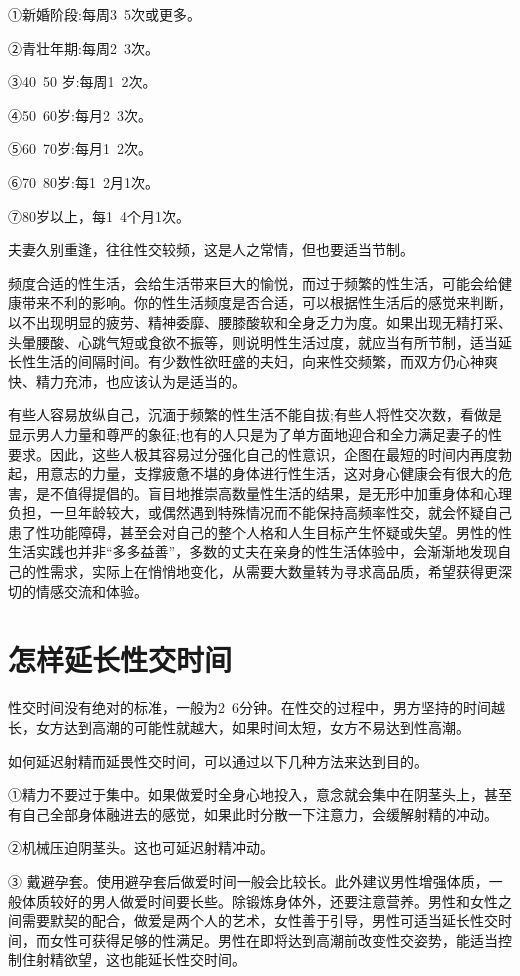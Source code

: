 \documentclass[12pt,UTF8]{ctexbook}
\begin{document}
①新婚阶段:每周3~5次或更多。

②青壮年期:每周2~3次。

③40~50 岁:每周1~2次。

④50~60岁:每月2~3次。

⑤60~70岁:每月1~2次。

⑥70~80岁:每1~2月1次。

⑦80岁以上，每1~4个月1次。

夫妻久别重逢，往往性交较频，这是人之常情，但也要适当节制。

频度合适的性生活，会给生活带来巨大的愉悦，而过于频繁的性生活，可能会给健康带来不利的影响。你的性生活频度是否合适，可以根据性生活后的感觉来判断，以不出现明显的疲劳、精神委靡、腰膝酸软和全身乏力为度。如果出现无精打采、头暈腰酸、心跳气短或食欲不振等，则说明性生活过度，就应当有所节制，适当延长性生活的间隔时间。有少数性欲旺盛的夫妇，向来性交频繁，而双方仍心神爽快、精力充沛，也应该认为是适当的。

有些人容易放纵自己，沉湎于频繁的性生活不能自拔;有些人将性交次数，看做是显示男人力量和尊严的象征;也有的人只是为了单方面地迎合和全力满足妻子的性要求。因此，这些人极其容易过分强化自己的性意识，企图在最短的时间内再度勃起，用意志的力量，支撑疲惫不堪的身体进行性生活，这对身心健康会有很大的危害，是不值得提倡的。盲目地推崇高数量性生活的结果，是无形中加重身体和心理负担，一旦年龄较大，或偶然遇到特殊情况而不能保持高频率性交，就会怀疑自己患了性功能障碍，甚至会对自己的整个人格和人生目标产生怀疑或失望。男性的性生活实践也并非“多多益善”，多数的丈夫在亲身的性生活体验中，会渐渐地发现自己的性需求，实际上在悄悄地变化，从需要大数量转为寻求高品质，希望获得更深切的情感交流和体验。

\section{怎样延长性交时间}

性交时间没有绝对的标准，一般为2~6分钟。在性交的过程中，男方坚持的时间越长，女方达到高潮的可能性就越大，如果时间太短，女方不易达到性高潮。

如何延迟射精而延畏性交时间，可以通过以下几种方法来达到目的。

①精力不要过于集中。如果做爱时全身心地投入，意念就会集中在阴茎头上，甚至有自己全部身体融进去的感觉，如果此时分散一下注意力，会缓解射精的冲动。

②机械压迫阴茎头。这也可延迟射精冲动。

③ 戴避孕套。使用避孕套后做爱时间一般会比较长。此外建议男性增强体质，一般体质较好的男人做爱时间要长些。除锻炼身体外，还要注意营养。男性和女性之间需要默契的配合，做爱是两个人的艺术，女性善于引导，男性可适当延长性交时间，而女性可获得足够的性满足。男性在即将达到高潮前改变性交姿势，能适当控制住射精欲望，这也能延长性交时间。
\end{document}

